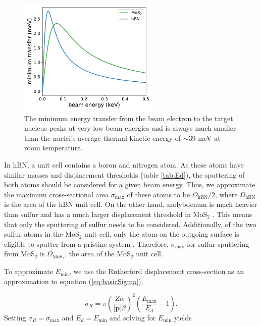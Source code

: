 \documentclass{article}
\begin{document}
\begin{figure}[H]
  \centering
  \includegraphics[width=0.6\textwidth]{images/Emin.pdf}
  \caption{
    The minimum energy transfer from the beam electron to the target nucleus
    peaks at very low beam energies and is always much smaller than the
    nuclei's average thermal kinetic energy of $\sim$39 meV at room
    temperature. 
  }
  \label{fig:Emin}
\end{figure}

In hBN, a unit cell contains a boron and nitrogen atom.
As these atoms have similar masses and displacement thresholds (table
\ref{tab:Ed}), the sputtering of both atoms should be considered for a given
beam energy.
Thus, we approximate the maximum cross-sectional area $\sigma_\text{max}$ of
these atoms to be $\Omega_\text{hBN}/2$, where $\Omega_\text{hBN}$ is the area
of the hBN unit cell.
On the other hand, molybdenum is much heavier than sulfur and has a much larger
displacement threshold in MoS$_2$ \cite{Komsa2012}.  
This means that only the sputtering of sulfur needs to be considered.
Additionally, of the two sulfur atoms in the MoS$_2$ unit cell, only the atom
on the outgoing surface is eligible to sputter from a pristine system
\cite{Komsa2012}.
Therefore, $\sigma_\text{max}$ for sulfur sputtering from MoS$_2$ is
$\Omega_\text{MoS$_2$}$, the area of the MoS$_2$ unit cell.

To approximate $E_\text{min}$, we use the Rutherford displacement cross-section
\cite{Thornton2004, Sakurai2011, Yoshimura2018} as an approximation to equation
(\ref{eq:basicSigma}),

\begin{equation}
  \sigma_R
  =
  \pi\left(\frac{Z\alpha}{|\mathbf{p}|\beta}\right)^2
  \left(\frac{E_\text{max}}{E_d} - 1\right).
  \label{eq:Rutherford}
\end{equation}
%
Setting $\sigma_R=\sigma_\text{max}$ and $E_d=E_\text{min}$ and solving for
$E_\text{min}$ yields
\end{document}
